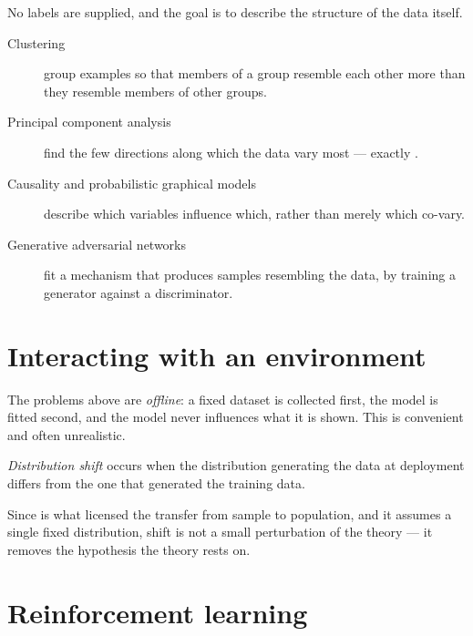 No labels are supplied, and the goal is to describe the structure of the data
itself.

\begin{description}
	\item[Clustering] group examples so that members of a group resemble each
	other more than they resemble members of other groups.
	\item[Principal component analysis] find the few directions along which the
	data vary most --- exactly .
	\item[Causality and probabilistic graphical models] describe which variables
	influence which, rather than merely which co-vary.
	\item[Generative adversarial networks] fit a mechanism that produces samples
	resembling the data, by training a generator against a discriminator.
\end{description}


\section{Interacting with an environment}

The problems above are \emph{offline}: a fixed dataset is collected first, the
model is fitted second, and the model never influences what it is shown. This is
convenient and often unrealistic.

\begin{definition}
\emph{Distribution shift} occurs when the distribution generating the data at
deployment differs from the one that generated the training data.
\end{definition}

Since  is what licensed the transfer from sample to population, and
it assumes a single fixed distribution, shift is not a small perturbation of the
theory --- it removes the hypothesis the theory rests on.

\section{Reinforcement learning}

